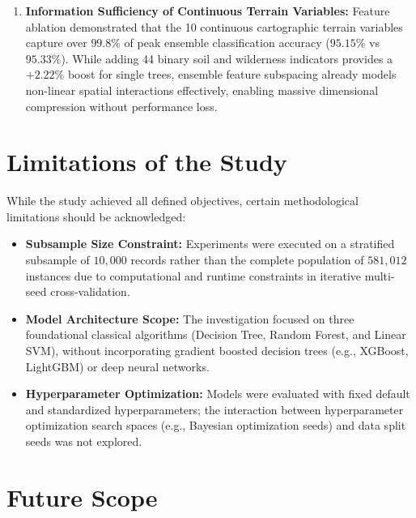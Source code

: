 \begin{enumerate}
    \item \textbf{Information Sufficiency of Continuous Terrain Variables:} Feature ablation demonstrated that the 10 continuous cartographic terrain variables capture over $99.8\%$ of peak ensemble classification accuracy ($95.15\%$ vs $95.33\%$). While adding 44 binary soil and wilderness indicators provides a $+2.22\%$ boost for single trees, ensemble feature subspacing already models non-linear spatial interactions effectively, enabling massive dimensional compression without performance loss.
\end{enumerate}

\section{Limitations of the Study}
\label{sec:limitations}

While the study achieved all defined objectives, certain methodological limitations should be acknowledged:
\begin{itemize}
    \item \textbf{Subsample Size Constraint:} Experiments were executed on a stratified subsample of $10,000$ records rather than the complete population of $581,012$ instances due to computational and runtime constraints in iterative multi-seed cross-validation.
    \item \textbf{Model Architecture Scope:} The investigation focused on three foundational classical algorithms (Decision Tree, Random Forest, and Linear SVM), without incorporating gradient boosted decision trees (e.g., XGBoost, LightGBM) or deep neural networks.
    \item \textbf{Hyperparameter Optimization:} Models were evaluated with fixed default and standardized hyperparameters; the interaction between hyperparameter optimization search spaces (e.g., Bayesian optimization seeds) and data split seeds was not explored.
\end{itemize}

\section{Future Scope}
\label{sec:future_scope}

